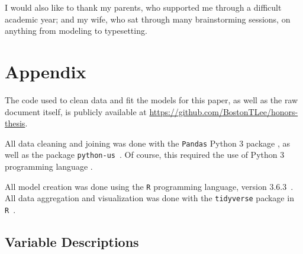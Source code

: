 \documentclass{article}
\begin{document}
I would also like to thank my parents, who supported
me through a difficult academic year; and my wife,
who sat through many brainstorming sessions,
on anything from modeling to typesetting.

\pagebreak

\section{Appendix}

The code used to clean data and fit the models for this
paper, as well as the raw document itself,
is publicly available at
\url{https://github.com/BostonTLee/honors-thesis}.

All data cleaning and joining was done with the \texttt{Pandas} Python 3 package
\cite{python_pandas}, as well as the package \texttt{python-us}~\cite{python_us}.
Of course, this required the use of Python 3 programming language
\cite{python_lang}.

All model creation was done using the \texttt{R} programming
language, version 3.6.3~\cite{r_lang}.
All data aggregation and visualization was done with the
\texttt{tidyverse} package in \texttt{R}~\cite{r_tidyverse}.

\subsection{Variable Descriptions}\label{sec:variables}

\newcommand\censuscodes{https://www.census.gov/programs-surveys/acs/technical-documentation/code-lists.2018.html}
\newcommand\descentdesc[1]{ Proportion of the population which is of
    #1 descent. See \url{\censuscodes} for more
    pecise definitions.}
\newcommand\descentreason{Ethnicity is tied to socioeconomic status, which
    could in turn be correlated to one's financial status and mental health.
    Variables related to ethnicity were included to control for variation.}
\newcommand\agedescto[2]{Proportion of the population from #1 to #2 years old.}
\newcommand\agedescover[1]{Proportion of the population over #1 years old.}
\newcommand\agereason{Overall economic status could vary with age, so age
    variables were included to control for variation.}
\newcommand\educationdesc[1]{Proportion of the population 25 years of age and
    over whose maximum educational attainment is #1.}
\newcommand\educationreason{Educational attainment can be used as a general
    measure of socioeconomic status. Variables related to educational
    attainment were included to account for variation.}
\newcommand\maritaldesc[1]{Proportion of the population age 15 and older who
    have marital status ``#1".}
\newcommand\maritalreason{Marital status reflects general socioeconomic status.
    Variables related to marital status are included to account for variation.}
\end{document}
